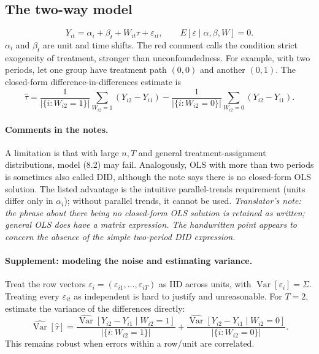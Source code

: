 \subsection{The two-way model}
\[
Y_{it}=\alpha_i+\beta_t+W_{it}\tau+\varepsilon_{it},
\qquad E[\varepsilon\mid\alpha,\beta,W]=0.
\tag{8.2 in the notes}
\]
$\alpha_i$ and $\beta_t$ are unit and time shifts. The red comment calls the condition strict exogeneity of treatment, stronger than unconfoundedness. For example, with two periods, let one group have treatment path $(0,0)$ and another $(0,1)$. The closed-form difference-in-differences estimate is
\[
\widehat\tau=\frac1{|\{i:W_{i2}=1\}|}\sum_{W_{i2}=1}(Y_{i2}-Y_{i1})
-\frac1{|\{i:W_{i2}=0\}|}\sum_{W_{i2}=0}(Y_{i2}-Y_{i1}).
\]
\paragraph{Comments in the notes.}
A limitation is that with large $n,T$ and general treatment-assignment distributions, model (8.2) may fail. Analogously, OLS with more than two periods is sometimes also called DID, although the note says there is no closed-form OLS solution. The listed advantage is the intuitive parallel-trends requirement (units differ only in $\alpha_i$); without parallel trends, it cannot be used.
\textit{Translator's note: the phrase about there being no closed-form OLS solution is retained as written; general OLS does have a matrix expression. The handwritten point appears to concern the absence of the simple two-period DID expression.}
\paragraph{Supplement: modeling the noise and estimating variance.}
Treat the row vectors $\varepsilon_i=(\varepsilon_{i1},\ldots,\varepsilon_{iT})$ as IID across units, with $\operatorname{Var}[\varepsilon_i]=\Sigma$. Treating every $\varepsilon_{it}$ as independent is hard to justify and unreasonable. For $T=2$, estimate the variance of the differences directly:
\[
\widehat{\operatorname{Var}}[\widehat\tau]
=\frac{\widehat{\operatorname{Var}}[Y_{i2}-Y_{i1}\mid W_{i2}=1]}{|\{i:W_{i2}=1\}|}
+\frac{\widehat{\operatorname{Var}}[Y_{i2}-Y_{i1}\mid W_{i2}=0]}{|\{i:W_{i2}=0\}|}.
\tag{8.4 in the notes}
\]
This remains robust when errors within a row/unit are correlated.
